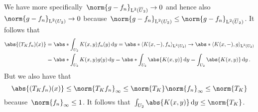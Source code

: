 We have more specifically~$\norm{g - f_n}_{\Lp^2(\closure{U}_2)} \to 0$ and hence also~$\norm{g - f_n}_{\Lp^2(U_2)} \to 0$ because~$\norm{g - f_n}_{\Lp^2(U_2)} \leq \norm{g - f_n}_{\Lp^2(\closure{U}_2)}$.
It follows that
\begin{align*}
        \abs{ (T_K f_n)(x) }
  &=    \abs*{ \int_{U_2} K(x,y) f_n(y) \dd{y} }
   =    \abs*{ \bil{ K(x,-) , f_n }_{\Lp^2(U_2)} }
   \to  \abs*{ \bil{ K(x,-), g}_{\Lp^2(U_2)} }  \\
  &=    \abs*{ \int_{U_2} K(x,y) g(y) \dd{y} }
   =    \abs*{ \int_{U_2} \abs{K(x,y)} \dd{y} }
   =    \int_{U_2} \abs{K(x,y)} \dd{y} \,.
\end{align*}
But we also have that
\[
        \abs{ (T_K f_n)(x) }
  \leq  \norm{ T_K f_n }_\infty
  \leq  \norm{ T_K } \norm{f_n}_\infty
  \leq  \norm{ T_K }
\]
because~$\norm{f_n}_\infty \leq 1$.
It follows that~$\int_{U_2} \abs{K(x,y)} \dd{y} \leq \norm{ T_K }$.





% 
% 











